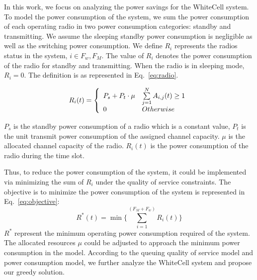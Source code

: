 In this work, we focus on analyzing the power savings for the  
WhiteCell system. 
To model the power consumption of the system, we sum the power consumption of each operating 
radio in two power consumption categories: standby and transmitting.
We assume the sleeping standby power consumption is negligible as well as the switching power consumption. 
We define $R_i$ represents the radios status in the system, $i\in {F_w,F_M}$. 
The value of $R_i$ denotes the power consumption of the radio for standby and transmitting.
When the radio is in sleeping mode, $R_i = 0$. 
The definition is as represented in Eq.~\ref{eq:radio}.

\begin{equation}
\label{eq:radio}
 R_i(t) = \left\{ 
	  \begin{array}{l l}
	    P_s+P_t\cdot\mu   &  \sum\limits_{j=1}^N A_{i,j}(t) \ge 1\\
		0 &  Otherwise
			    \end{array} \right.
\end{equation}

$P_s$ is the standby power consumption of a radio which is a constant value, $P_t$ is the 
unit transmit power consumption of the assigned channel capacity. 
$\mu$ is the allocated channel capacity of the radio.
$R_i(t)$ is the power consumption of the radio during the time slot.

Thus, to reduce the power consumption of the system, it could be 
implemented via minimizing the sum of $R_i$ under the quality of service constraints. 
The objective is to minimize the power consumption of the system is represented in Eq.~\ref{eq:objective}:
\begin{equation}
\label{eq:objective}
R^*(t) = \min{\{\sum\limits_{i=1}^{(F_M+F_w)} R_{i}}(t)\}
\end{equation}
$R^*$ represent the minimum operating power consumption required of the system. 
The allocated resources $\mu$ could be adjusted to approach the minimum power consumption 
in the model. 
According to the queuing quality of service model and power consumption model, 
we further analyze the WhiteCell system and propose our greedy solution.

